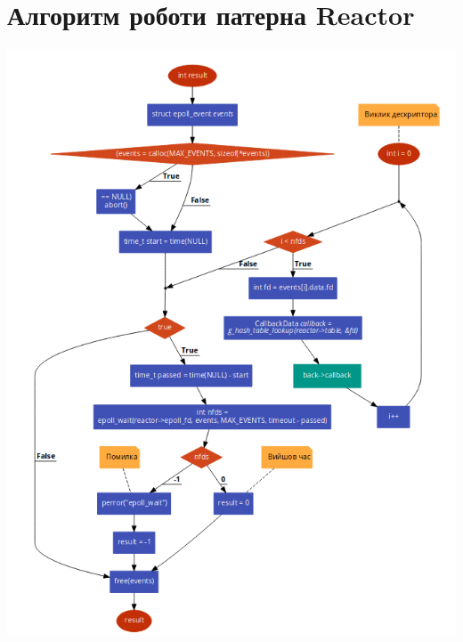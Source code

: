 \documentclass[a4paper]{report}
\begin{document}
\section*{Алгоритм роботи патерна Reactor}
\includegraphics[width=1\textwidth, height=1.5\textwidth]{reactor_algo}
\end{document}
